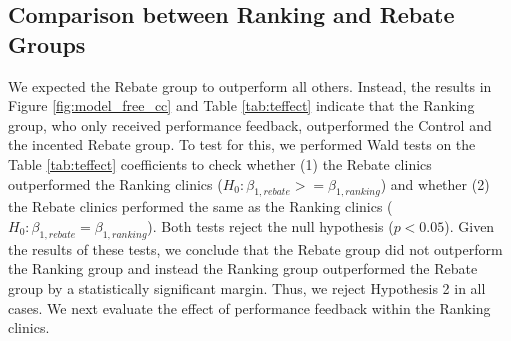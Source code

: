 \begin{onehalfspace}
  \begin{table}[htbp]
 \end{table}
 
 \subsection{Comparison between Ranking and Rebate Groups}
 We expected the Rebate group to outperform all others. Instead, the results in Figure \ref{fig:model_free_cc} and Table \ref{tab:teffect} indicate that the Ranking group, who only received performance feedback, outperformed the Control and the incented Rebate group. To test for this, we performed Wald tests on the Table \ref{tab:teffect} coefficients to check whether (1) the Rebate clinics outperformed the Ranking clinics ($H_0: \beta_{1,rebate} >= \beta_{1,ranking}$) and whether (2) the Rebate clinics performed the same as the Ranking clinics ($H_0: \beta_{1,rebate} = \beta_{1,ranking}$). Both tests reject the null hypothesis ($p < 0.05$). Given the results of these tests, we conclude that the Rebate group did not outperform the Ranking group and instead the Ranking group outperformed the Rebate group by a statistically significant margin. Thus, we reject Hypothesis 2 in all cases. We next evaluate the effect of performance feedback within the Ranking clinics. 
 

\end{onehalfspace}
